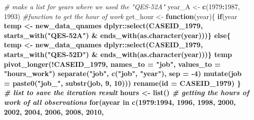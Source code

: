 \documentclass{article}
\newenvironment{Shaded}{\begin{snugshade}}{\end{snugshade}}
\newcommand{\CommentTok}[1]{\textcolor[rgb]{0.56,0.35,0.01}{\textit{#1}}}
\newcommand{\ControlFlowTok}[1]{\textcolor[rgb]{0.13,0.29,0.53}{\textbf{#1}}}
\newcommand{\DataTypeTok}[1]{\textcolor[rgb]{0.13,0.29,0.53}{#1}}
\newcommand{\DecValTok}[1]{\textcolor[rgb]{0.00,0.00,0.81}{#1}}
\newcommand{\KeywordTok}[1]{\textcolor[rgb]{0.13,0.29,0.53}{\textbf{#1}}}
\newcommand{\NormalTok}[1]{#1}
\newcommand{\OperatorTok}[1]{\textcolor[rgb]{0.81,0.36,0.00}{\textbf{#1}}}
\newcommand{\StringTok}[1]{\textcolor[rgb]{0.31,0.60,0.02}{#1}}
\begin{document}
\begin{Shaded}
\begin{Highlighting}[]
\CommentTok{# make a list for years where we used the "QES-52A"}
\NormalTok{year_A <-}\StringTok{ }\KeywordTok{c}\NormalTok{(}\DecValTok{1979}\OperatorTok{:}\DecValTok{1987}\NormalTok{, }\DecValTok{1993}\NormalTok{)}
\CommentTok{#function to get the hour of work}
\NormalTok{get_hour <-}\StringTok{ }\ControlFlowTok{function}\NormalTok{(year)\{}
  \ControlFlowTok{if}\NormalTok{(year }\OperatorTok{%
\NormalTok{    temp <-}\StringTok{ }\NormalTok{new_data_qnames }\OperatorTok{%
\StringTok{      }\NormalTok{dplyr}\OperatorTok{::}\KeywordTok{select}\NormalTok{(CASEID_}\DecValTok{1979}\NormalTok{,}
                    \KeywordTok{starts_with}\NormalTok{(}\StringTok{"QES-52A"}\NormalTok{) }\OperatorTok{&}
\StringTok{                      }\KeywordTok{ends_with}\NormalTok{(}\KeywordTok{as.character}\NormalTok{(year)))\}}
  \ControlFlowTok{else}\NormalTok{\{}
\NormalTok{    temp <-}\StringTok{ }\NormalTok{new_data_qnames }\OperatorTok{%
\StringTok{      }\NormalTok{dplyr}\OperatorTok{::}\KeywordTok{select}\NormalTok{(CASEID_}\DecValTok{1979}\NormalTok{,}
                    \KeywordTok{starts_with}\NormalTok{(}\StringTok{"QES-52D"}\NormalTok{) }\OperatorTok{&}
\StringTok{                      }\KeywordTok{ends_with}\NormalTok{(}\KeywordTok{as.character}\NormalTok{(year)))\}}
\NormalTok{  temp }\OperatorTok{%
\StringTok{    }\KeywordTok{pivot_longer}\NormalTok{(}\OperatorTok{!}\NormalTok{CASEID_}\DecValTok{1979}\NormalTok{,}
                 \DataTypeTok{names_to =} \StringTok{"job"}\NormalTok{,}
                 \DataTypeTok{values_to =} \StringTok{"hours_work"}\NormalTok{) }\OperatorTok{%
\StringTok{    }\KeywordTok{separate}\NormalTok{(}\StringTok{"job"}\NormalTok{, }\KeywordTok{c}\NormalTok{(}\StringTok{"job"}\NormalTok{, }\StringTok{"year"}\NormalTok{), }\DataTypeTok{sep =} \DecValTok{-4}\NormalTok{) }\OperatorTok{%
\StringTok{    }\KeywordTok{mutate}\NormalTok{(}\DataTypeTok{job =} \KeywordTok{paste0}\NormalTok{(}\StringTok{"job_"}\NormalTok{, }\KeywordTok{substr}\NormalTok{(job, }\DecValTok{9}\NormalTok{, }\DecValTok{10}\NormalTok{))) }\OperatorTok{%
\StringTok{    }\KeywordTok{rename}\NormalTok{(}\DataTypeTok{id =}\NormalTok{ CASEID_}\DecValTok{1979}\NormalTok{)}
\NormalTok{\}}
\CommentTok{# list to save the iteration result}
\NormalTok{hours <-}\StringTok{ }\KeywordTok{list}\NormalTok{()}
\CommentTok{# getting the hours of work of all observations}
\ControlFlowTok{for}\NormalTok{(ayear }\ControlFlowTok{in} \KeywordTok{c}\NormalTok{(}\DecValTok{1979}\OperatorTok{:}\DecValTok{1994}\NormalTok{, }\DecValTok{1996}\NormalTok{, }\DecValTok{1998}\NormalTok{, }\DecValTok{2000}\NormalTok{, }\DecValTok{2002}\NormalTok{, }\DecValTok{2004}\NormalTok{, }\DecValTok{2006}\NormalTok{, }\DecValTok{2008}\NormalTok{, }\DecValTok{2010}\NormalTok{,}
}}}}}}}
\end{Highlighting}
\end{Shaded}
\end{document}
